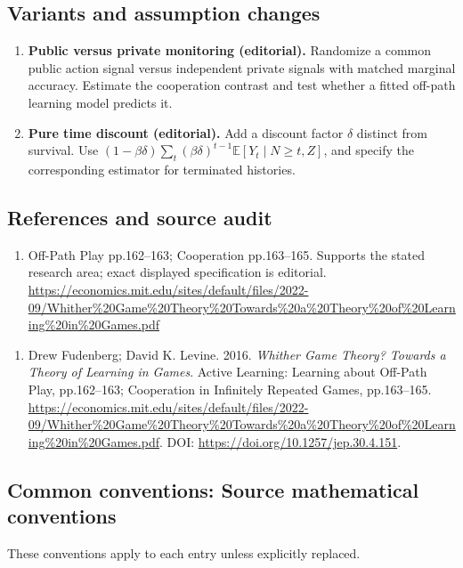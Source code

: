 \documentclass[11pt,a4paper]{article}
\begin{document}
\subsection*{Variants and assumption changes}
\begin{enumerate}
\item \textbf{Public versus private monitoring (editorial).} Randomize a common public action signal versus independent private signals with matched marginal accuracy. Estimate the cooperation contrast and test whether a fitted off-path learning model predicts it.
\item \textbf{Pure time discount (editorial).} Add a discount factor \(\delta\) distinct from survival. Use \((1-\beta\delta)\sum_t(\beta\delta)^{t-1}\mathbb E[Y_t\mid N\ge t,Z]\), and specify the corresponding estimator for terminated histories.
\end{enumerate}
\subsection*{References and source audit}
\begin{enumerate}
\item Off-Path Play pp.162–163; Cooperation pp.163–165. Supports the stated research area; exact displayed specification is editorial. \url{https://economics.mit.edu/sites/default/files/2022-09/Whither%20Game%20Theory%20Towards%20a%20Theory%20of%20Learning%20in%20Games.pdf}
\end{enumerate}
\begin{enumerate}\raggedright
\item\hypertarget{definitions:source:30007564:1}{} Drew Fudenberg; David K. Levine. 2016. \emph{Whither Game Theory? Towards a Theory of Learning in Games}. Active Learning: Learning about Off-Path Play, pp.162–163; Cooperation in Infinitely Repeated Games, pp.163–165.
\url{https://economics.mit.edu/sites/default/files/2022-09/Whither%20Game%20Theory%20Towards%20a%20Theory%20of%20Learning%20in%20Games.pdf}.
DOI: \url{https://doi.org/10.1257/jep.30.4.151}.
\end{enumerate}

\subsection*{Common conventions: Source mathematical conventions}

These conventions apply to each entry unless explicitly replaced.
\end{document}
